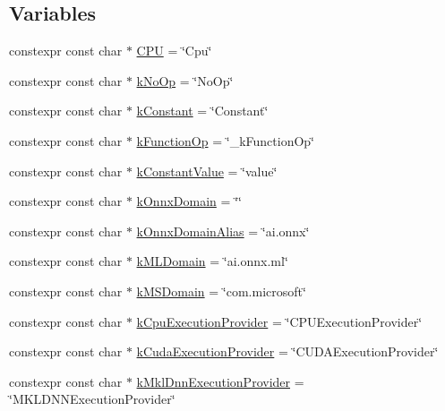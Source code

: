 \subsection*{Variables}
\begin{DoxyCompactItemize}
\item 
constexpr const char $\ast$ \mbox{\hyperlink{namespaceonnxruntime_ac6ee3a867a193f66e22c8ae8763d5924}{C\+PU}} = \char`\"{}Cpu\char`\"{}
\item 
constexpr const char $\ast$ \mbox{\hyperlink{namespaceonnxruntime_ab4607320256ed5d4cbe7b3049e971f05}{k\+No\+Op}} = \char`\"{}No\+Op\char`\"{}
\item 
constexpr const char $\ast$ \mbox{\hyperlink{namespaceonnxruntime_aa7d287957860bcc4077a9a4a3c9f8ec1}{k\+Constant}} = \char`\"{}Constant\char`\"{}
\item 
constexpr const char $\ast$ \mbox{\hyperlink{namespaceonnxruntime_ac27a6257ba083f2c30a496483f22a199}{k\+Function\+Op}} = \char`\"{}\+\_\+k\+Function\+Op\char`\"{}
\item 
constexpr const char $\ast$ \mbox{\hyperlink{namespaceonnxruntime_a5e358a273936ef3f84e3043a26381764}{k\+Constant\+Value}} = \char`\"{}value\char`\"{}
\item 
constexpr const char $\ast$ \mbox{\hyperlink{namespaceonnxruntime_ac0e7c0c106a2c9e9594560a3ab289fa0}{k\+Onnx\+Domain}} = \char`\"{}\char`\"{}
\item 
constexpr const char $\ast$ \mbox{\hyperlink{namespaceonnxruntime_a77f9a21cd6f5bfabb3d0b6e40341f39c}{k\+Onnx\+Domain\+Alias}} = \char`\"{}ai.\+onnx\char`\"{}
\item 
constexpr const char $\ast$ \mbox{\hyperlink{namespaceonnxruntime_a76df7dd63759039fc62486d6691e70e5}{k\+M\+L\+Domain}} = \char`\"{}ai.\+onnx.\+ml\char`\"{}
\item 
constexpr const char $\ast$ \mbox{\hyperlink{namespaceonnxruntime_a1e63b08774e23395d961e8e35fb62db1}{k\+M\+S\+Domain}} = \char`\"{}com.\+microsoft\char`\"{}
\item 
constexpr const char $\ast$ \mbox{\hyperlink{namespaceonnxruntime_a394a3c7e50622de1f203a96df592060d}{k\+Cpu\+Execution\+Provider}} = \char`\"{}C\+P\+U\+Execution\+Provider\char`\"{}
\item 
constexpr const char $\ast$ \mbox{\hyperlink{namespaceonnxruntime_a73ebc64887ddd1968e3cef47ffefe35b}{k\+Cuda\+Execution\+Provider}} = \char`\"{}C\+U\+D\+A\+Execution\+Provider\char`\"{}
\item 
constexpr const char $\ast$ \mbox{\hyperlink{namespaceonnxruntime_abd1901c951bcb5845eeeaff9dd75ce97}{k\+Mkl\+Dnn\+Execution\+Provider}} = \char`\"{}M\+K\+L\+D\+N\+N\+Execution\+Provider\char`\"{}

\end{DoxyCompactItemize}
